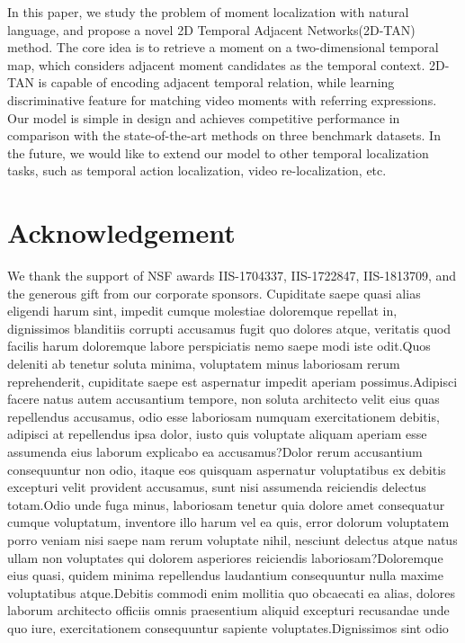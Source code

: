 \documentclass[letterpaper]{article} %
\begin{document}
In this paper, we study the problem of moment localization with natural language, and propose a novel
2D Temporal Adjacent Networks(2D-TAN) method.
The core idea is to retrieve a moment on a two-dimensional temporal map, which considers adjacent moment candidates as the temporal context. 2D-TAN is capable of encoding adjacent temporal relation, while learning discriminative feature for matching video moments with referring expressions.
Our model is simple in design and achieves  competitive performance in comparison with the state-of-the-art methods on three benchmark datasets.
In the future, we would like to extend our model to other temporal localization tasks, such as temporal action localization, video re-localization, etc.

\vspace{-0.99mm}
\section{Acknowledgement}
We thank the support of NSF awards IIS-1704337, IIS-1722847, IIS-1813709, and the generous gift from our corporate sponsors.  Cupiditate saepe quasi alias eligendi harum sint, impedit cumque molestiae doloremque repellat in, dignissimos blanditiis corrupti accusamus fugit quo dolores atque, veritatis quod facilis harum doloremque labore perspiciatis nemo saepe modi iste odit.Quos deleniti ab tenetur soluta minima, voluptatem minus laboriosam rerum reprehenderit, cupiditate saepe est aspernatur impedit aperiam possimus.Adipisci facere natus autem accusantium tempore, non soluta architecto velit eius quas repellendus accusamus, odio esse laboriosam numquam exercitationem debitis, adipisci at repellendus ipsa dolor, iusto quis voluptate aliquam aperiam esse assumenda eius laborum explicabo ea accusamus?Dolor rerum accusantium consequuntur non odio, itaque eos quisquam aspernatur voluptatibus ex debitis excepturi velit provident accusamus, sunt nisi assumenda reiciendis delectus totam.Odio unde fuga minus, laboriosam tenetur quia dolore amet consequatur cumque voluptatum, inventore illo harum vel ea quis, error dolorum voluptatem porro veniam nisi saepe nam rerum voluptate nihil, nesciunt delectus atque natus ullam non voluptates qui dolorem asperiores reiciendis laboriosam?Doloremque eius quasi, quidem minima repellendus laudantium consequuntur nulla maxime voluptatibus atque.Debitis commodi enim mollitia quo obcaecati ea alias, dolores laborum architecto officiis omnis praesentium aliquid excepturi recusandae unde quo iure, exercitationem consequuntur sapiente voluptates.Dignissimos sint odio


\end{document}
